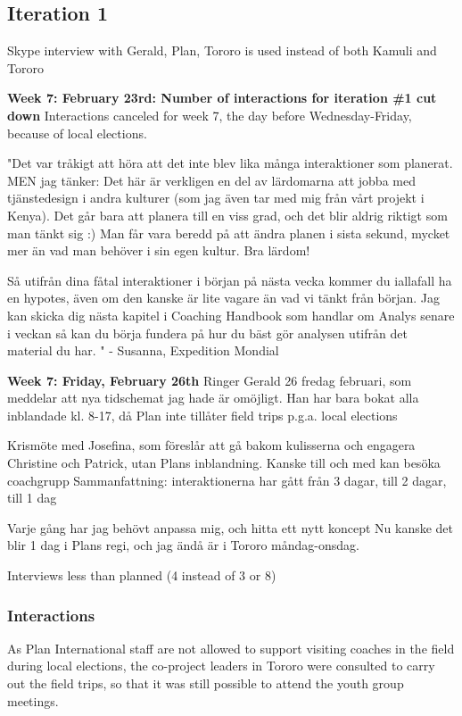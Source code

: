 \subsection{Iteration 1}
Skype interview with Gerald, Plan, Tororo is used instead of both Kamuli and Tororo

\textbf{Week 7: February 23rd: Number of interactions for iteration \#1 cut down}
Interactions canceled for week 7, the day before Wednesday-Friday, because of local elections.

"Det var tråkigt att höra att det inte blev lika många interaktioner som planerat.
MEN jag tänker: Det här är verkligen en del av lärdomarna att jobba med tjänstedesign i andra kulturer (som jag även tar med mig från vårt projekt i Kenya). Det går bara att planera till en viss grad, och det blir aldrig riktigt som man tänkt sig :) Man får vara beredd på att ändra planen i sista sekund, mycket mer än vad man behöver i sin egen kultur. Bra lärdom!

Så utifrån dina fåtal interaktioner i början på nästa vecka kommer du iallafall ha en hypotes, även om den kanske är lite vagare än vad vi tänkt från början. Jag kan skicka dig nästa kapitel i Coaching Handbook som handlar om Analys senare i veckan så kan du börja fundera på hur du bäst gör analysen utifrån det material du har. " - Susanna, Expedition Mondial

\textbf{Week 7: Friday, February 26th}
Ringer Gerald 26 fredag februari, som meddelar att nya tidschemat jag hade är omöjligt. Han har bara bokat alla inblandade kl. 8-17, då Plan inte tillåter field trips p.g.a. local elections

Krismöte med Josefina, som föreslår att gå bakom kulisserna och engagera Christine och Patrick, utan Plans inblandning. Kanske till och med kan besöka coachgrupp
Sammanfattning: interaktionerna har gått från 3 dagar, till 2 dagar, till 1 dag

Varje gång har jag behövt anpassa mig, och hitta ett nytt koncept
Nu kanske det blir 1 dag i Plans regi, och jag ändå är i Tororo måndag-onsdag.

Interviews less than planned (4 instead of 3 or 8)

\subsubsection{Interactions}

As Plan International staff are not allowed to support visiting coaches in the field during local elections, the co-project leaders in Tororo were consulted to carry out the field trips, so that it was still possible to attend the youth group meetings.

